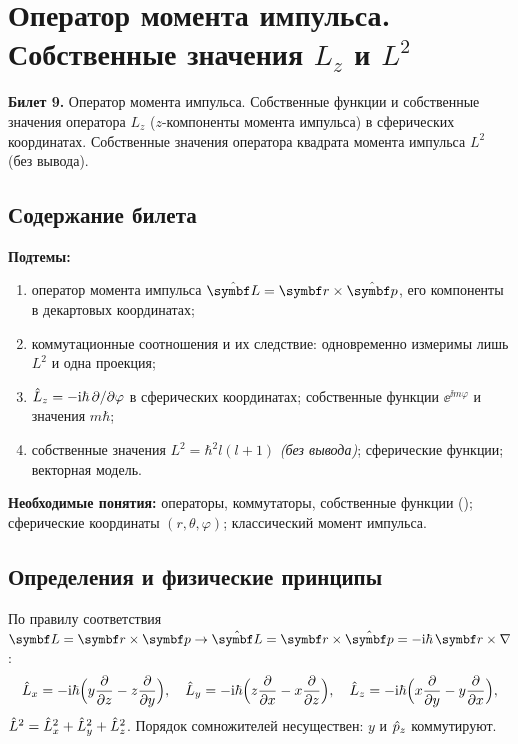\chapter[Оператор момента импульса]%
        {Оператор момента импульса. Собственные значения \texorpdfstring{$L_z$ и $L^2$}{Lz и L²}}
\label{t:09}

\begin{qbox}
\textbf{Билет 9.} Оператор момента импульса. Собственные функции и собственные значения
оператора $L_z$ ($z$-компоненты момента импульса) в сферических координатах. Собственные значения
оператора квадрата момента импульса $L^2$ (без вывода).
\end{qbox}

\section{Содержание билета}

\textbf{Подтемы:}
\begin{enumerate}
 \item оператор момента импульса $\op{\vect L}=\vect r\times\op{\vect p}$, его компоненты в декартовых координатах;
 \item коммутационные соотношения и их следствие: одновременно измеримы лишь $L^2$ и одна проекция;
 \item $\hat{L}_z=-\mathrm{i}\hbar\,\partial/\partial\varphi$ в сферических координатах; собственные функции $\ee^{\ii m\varphi}$ и значения $m\hbar$;
 \item собственные значения $L^2=\hbar^2l(l+1)$ \emph{(без вывода)}; сферические функции; векторная модель.
\end{enumerate}

\textbf{Необходимые понятия:} операторы, коммутаторы, собственные функции ();
сферические координаты $(r,\theta,\varphi)$; классический момент импульса.

\section{Определения и физические принципы}

\begin{definition}
По правилу соответствия $\vect L=\vect r\times\vect p\to\op{\vect L}=\vect r\times\op{\vect p}=-\ii\hbar\,\vect r\times\nabla$:
\begin{equation}\label{eq:9:L}
  \hat{L}_x=-\mathrm{i}\hbar\Bigl(y\frac{\partial }{\partial z}-z\frac{\partial }{\partial y}\Bigr),\quad
  \hat{L}_y=-\mathrm{i}\hbar\Bigl(z\frac{\partial }{\partial x}-x\frac{\partial }{\partial z}\Bigr),\quad
  \hat{L}_z=-\mathrm{i}\hbar\Bigl(x\frac{\partial }{\partial y}-y\frac{\partial }{\partial x}\Bigr),
\end{equation}
$\hat{L}^2=\hat{L}_x^2+\hat{L}_y^2+\hat{L}_z^2$. Порядок сомножителей несуществен: $y$ и $\hat{p}_z$ коммутируют.
\end{definition}


